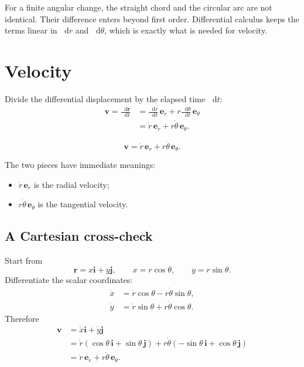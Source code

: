 \documentclass[11pt,a4paper]{article}
\newcommand{\er}{\bm e_r}
\newcommand{\etheta}{\bm e_\theta}
\newcommand{\ii}{\bm i}
\newcommand{\jj}{\bm j}
\newcommand{\rr}{\bm r}
\newcommand{\vv}{\bm v}
\newcommand{\dd}{\mathop{}\!\mathrm d}
\begin{document}
\begin{notecheck}
For a finite angular change, the straight chord and the circular arc are not identical. Their difference enters beyond first order. Differential calculus keeps the terms linear in $\dd r$ and $\dd\theta$, which is exactly what is needed for velocity.
\end{notecheck}

\clearpage

\section{Velocity}

Divide the differential displacement by the elapsed time $\dd t$:
\begin{align*}
  \vv
  =\frac{\dd\rr}{\dd t}
  &=\frac{\dd r}{\dd t}\,\er
    +r\frac{\dd\theta}{\dd t}\,\etheta \\
  &=\dot r\,\er+r\dot\theta\,\etheta.
\end{align*}

\begin{result}
\[
  \boxed{\vv=\dot r\,\er+r\dot\theta\,\etheta.}
\]
\end{result}

The two pieces have immediate meanings:

\begin{itemize}
  \item $\dot r\,\er$ is the radial velocity;
  \item $r\dot\theta\,\etheta$ is the tangential velocity.
\end{itemize}

\subsection{A Cartesian cross-check}

Start from
\[
  \rr=x\ii+y\jj,
  \qquad
  x=r\cos\theta,
  \qquad
  y=r\sin\theta.
\]
Differentiate the scalar coordinates:
\begin{align*}
  \dot x&=\dot r\cos\theta-r\dot\theta\sin\theta,\\
  \dot y&=\dot r\sin\theta+r\dot\theta\cos\theta.
\end{align*}
Therefore
\begin{align*}
  \vv
  &=\dot x\ii+\dot y\jj\\
  &=\dot r(\cos\theta\,\ii+\sin\theta\,\jj)
    +r\dot\theta(-\sin\theta\,\ii+\cos\theta\,\jj)\\
  &=\dot r\,\er+r\dot\theta\,\etheta.
\end{align*}
\end{document}

